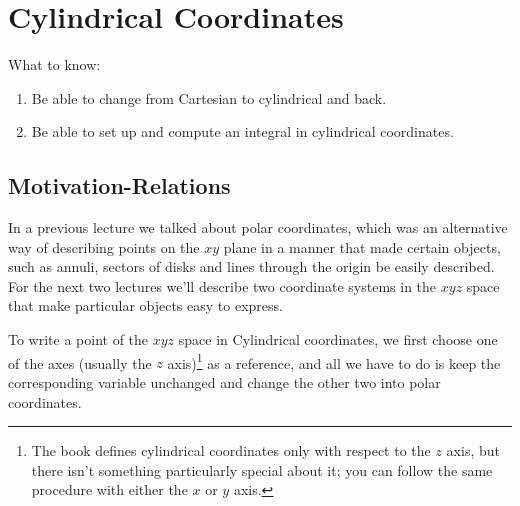 \documentclass[12pt]{article}
\title{}
\begin{document}
\section*{Cylindrical Coordinates}
What to know:
\begin{enumerate}
\item Be able to change from Cartesian to cylindrical and back.
\item Be able to set up and compute an integral in cylindrical coordinates.
\end{enumerate}


\subsection*{Motivation-Relations}
In a previous lecture we talked about polar coordinates, which was an alternative way of describing points on the $xy$ plane in a manner that made certain objects, such as annuli, sectors of disks and lines through the origin be easily described. For the next two lectures we'll describe two coordinate systems in the $xyz$ space that make particular objects easy to express.

To write a point of the $xyz$ space in Cylindrical coordinates, we first choose one of the axes (usually the $z$ axis)\footnote{The book defines cylindrical coordinates only with respect to the $z$ axis, but there isn't something particularly special about it; you can follow the same procedure with either the $x$ or $y$ axis.} as a reference, and all we have to do is keep the corresponding variable unchanged and change the other two into polar coordinates. 
\end{document}
